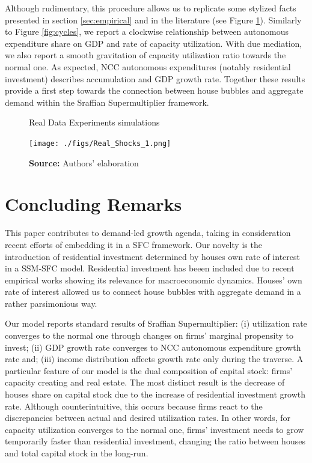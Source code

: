 \documentclass[11pt]{article}
\begin{document}
Although rudimentary, this procedure allows us to replicate some stylized facts presented in section \ref{sec:empirical} and in the literature (see Figure \ref{fig:Realresults_1}).
Similarly to Figure \ref{fig:cycles}, we report a clockwise relationship between autonomous expenditure share on GDP and rate of capacity utilization.
With due mediation, we also report a smooth gravitation of capacity utilization ratio towards the normal one.
As expected, NCC autonomous expenditures (notably residential investment) describes accumulation and GDP growth rate. 
Together these results provide a first step towards the connection between house bubbles and aggregate demand within the Sraffian Supermultiplier framework.






\begin{figure}[htb]
	\centering
	\caption{Real Data Experiments simulations}
	\label{fig:Realresults_1}
	\texttt{[image: ./figs/Real\_Shocks\_1.png]}
	\caption*{\textbf{Source:} Authors' elaboration}
\end{figure}



\section{Concluding Remarks}
\label{sec:orga68846e}
\label{sec:Conclusion}
This paper contributes to demand-led growth agenda, taking in consideration recent efforts of embedding it in a SFC framework.
Our novelty is the introduction of residential investment determined by houses own rate of interest in a SSM-SFC model.
Residential investment has beeen included due to recent empirical works showing its relevance for macroeconomic dynamics.
Houses' own rate of interest allowed us to connect house bubbles with aggregate demand in a rather parsimonious way.

Our model reports standard results of Sraffian Supermultiplier:
    (i) utilization rate converges to the normal one through changes on firms' marginal propensity to invest;
    (ii) GDP growth rate converges to NCC autonomous expenditure growth rate and;
    (iii) income distribution affects growth rate only during the traverse.
A particular feature of our model is the dual composition of capital stock: firms' capacity creating and real estate.
The most distinct result is the decrease of houses share on capital stock due to the increase of residential investment growth rate.
Although counterintuitive, this occurs because firms react to the discrepancies between actual and desired utilization rates.
In other words, for capacity utilization converges to the normal one,  firms' investment needs to grow temporarily faster than residential investment, changing the ratio between houses and total capital stock in the long-run.
\end{document}

